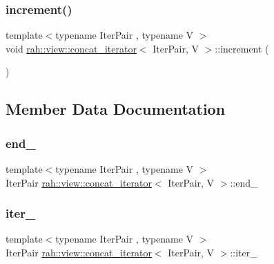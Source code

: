 \subsubsection{\texorpdfstring{increment()}{increment()}\hspace{0.1cm}{\footnotesize\ttfamily [2/2]}}
{\footnotesize\ttfamily template$<$typename Iter\+Pair , typename V $>$ \\
void \mbox{\hyperlink{structrah_1_1view_1_1concat__iterator}{rah\+::view\+::concat\+\_\+iterator}}$<$ Iter\+Pair, V $>$\+::increment (\begin{DoxyParamCaption}{ }\end{DoxyParamCaption})\hspace{0.3cm}{\ttfamily [inline]}}



\subsection{Member Data Documentation}
\mbox{\label{structrah_1_1view_1_1concat__iterator_a98e3cb2e64c68c2a5dd34da03293acea}} 
\subsubsection{\texorpdfstring{end\_}{end\_}}
{\footnotesize\ttfamily template$<$typename Iter\+Pair , typename V $>$ \\
Iter\+Pair \mbox{\hyperlink{structrah_1_1view_1_1concat__iterator}{rah\+::view\+::concat\+\_\+iterator}}$<$ Iter\+Pair, V $>$\+::end\+\_\+}

\mbox{\label{structrah_1_1view_1_1concat__iterator_affb17b45b66a04b01962c8b84dc20c43}} 
\subsubsection{\texorpdfstring{iter\_}{iter\_}}
{\footnotesize\ttfamily template$<$typename Iter\+Pair , typename V $>$ \\
Iter\+Pair \mbox{\hyperlink{structrah_1_1view_1_1concat__iterator}{rah\+::view\+::concat\+\_\+iterator}}$<$ Iter\+Pair, V $>$\+::iter\+\_\+}

